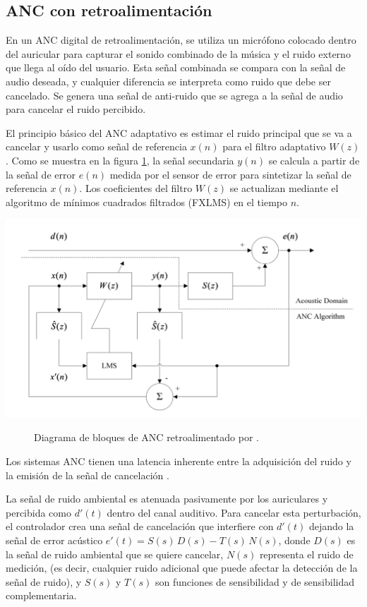 \documentclass[a4paper,12pt]{article}
\begin{document}
\subsection{ANC con retroalimentación}

En un ANC digital de retroalimentación, se utiliza un micrófono colocado dentro del auricular para capturar el sonido combinado de la música y el ruido externo que llega al oído del usuario.
Esta señal combinada se compara con la señal de audio deseada, y cualquier diferencia se interpreta como ruido que debe ser cancelado.
Se genera una señal de anti-ruido que se agrega a la señal de audio para cancelar el ruido percibido.

El principio básico del ANC adaptativo es estimar el ruido principal que se va a cancelar y usarlo como señal de referencia $x(n)$ para el filtro adaptativo $W(z)$.
Como se muestra en la figura \ref{fig:Kuo2018}, la señal secundaria $y(n)$ se calcula a partir de la señal de error $e(n)$ medida por el sensor de error para sintetizar la señal de referencia $x(n)$.
Los coeficientes del filtro $W(z)$ se actualizan mediante el algoritmo de mínimos cuadrados filtrados (FXLMS) en el tiempo $n$.

\begin{center}
    \includegraphics[width=0.9\linewidth]{images/feedback_ANC.png}
\end{center}
\vspace{\captionSpace}
\begin{figure}[H]
    \caption{Diagrama de bloques de ANC retroalimentado por \textcite[][3]{Kuo2018}.}
    \label{fig:Kuo2018}
\end{figure}

Los sistemas ANC tienen una latencia inherente entre la adquisición del ruido y la emisión de la señal de cancelación \parencite{Liebich2016}.

La señal de ruido ambiental es atenuada pasivamente por los auriculares y percibida como $d'(t)$ dentro del canal auditivo.
Para cancelar esta perturbación, el controlador crea una señal de cancelación que interfiere con $d'(t)$ dejando la señal de error acústico $e'(t) = S(s) \, D(s) - T(s) \, N(s)$, donde $D(s)$ es la señal de ruido ambiental que se quiere cancelar, $N(s)$ representa el ruido de medición, (es decir, cualquier ruido adicional que puede afectar la detección de la señal de ruido), y $S(s)$ y $T(s)$ son funciones de sensibilidad y de sensibilidad complementaria.
\end{document}
